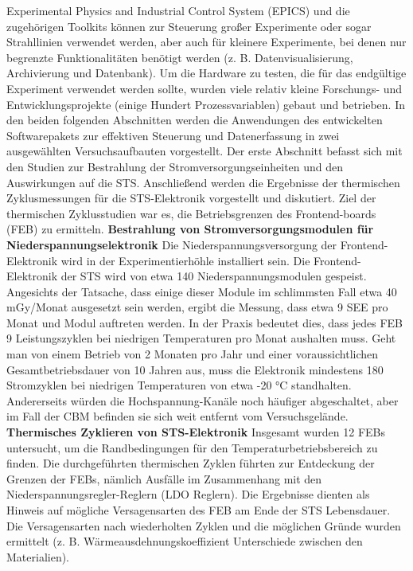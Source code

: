 Experimental Physics and Industrial Control System (EPICS) und die zugehörigen Toolkits können zur Steuerung großer Experimente oder sogar Strahllinien verwendet werden, aber auch für kleinere Experimente, bei denen nur begrenzte Funktionalitäten benötigt werden (z. B. Datenvisualisierung, Archivierung und Datenbank). Um die Hardware zu testen, die für das endgültige Experiment verwendet werden sollte, wurden viele relativ kleine Forschungs- und Entwicklungsprojekte (einige Hundert Prozessvariablen) gebaut und betrieben. In den beiden folgenden Abschnitten werden die Anwendungen des entwickelten Softwarepakets zur effektiven Steuerung und Datenerfassung in zwei ausgewählten Versuchsaufbauten vorgestellt. Der erste Abschnitt befasst sich mit den Studien zur Bestrahlung der Stromversorgungseinheiten und den Auswirkungen auf die \gls{STS}. Anschließend werden die Ergebnisse der thermischen Zyklusmessungen für die \gls{STS}-Elektronik vorgestellt und diskutiert. Ziel der thermischen Zyklusstudien war es, die Betriebsgrenzen des Frontend-boards (FEB) zu ermitteln.
\bigbreak
\textbf{Bestrahlung von Stromversorgungsmodulen für Niederspannungselektronik}
\bigbreak
Die Niederspannungsversorgung der Frontend-Elektronik wird in der Experimentierhöhle installiert sein. Die Frontend-Elektronik der \gls{STS} wird von etwa 140 Niederspannungsmodulen gespeist. Angesichts der Tatsache, dass einige dieser Module im schlimmsten Fall etwa 40\,mGy/Monat ausgesetzt sein werden, ergibt die Messung, dass etwa 9 SEE pro Monat und Modul auftreten werden. In der Praxis bedeutet dies, dass jedes FEB 9 Leistungszyklen bei niedrigen Temperaturen pro Monat aushalten muss. Geht man von einem Betrieb von 2 Monaten pro Jahr und einer voraussichtlichen Gesamtbetriebsdauer von 10 Jahren aus, muss die Elektronik mindestens 180 Stromzyklen bei niedrigen Temperaturen von etwa -20 °C standhalten. Andererseits würden die Hochspannung-Kanäle noch häufiger abgeschaltet, aber im Fall der \gls{CBM} befinden sie sich weit entfernt vom Versuchsgelände.
\bigbreak
\textbf{Thermisches Zyklieren von \gls{STS}-Elektronik}
\bigbreak
Insgesamt wurden 12 FEBs untersucht, um die Randbedingungen für den Temperaturbetriebsbereich zu finden. Die durchgeführten thermischen Zyklen führten zur Entdeckung der Grenzen der FEBs, nämlich Ausfälle im Zusammenhang mit den Niederspannungsregler-Reglern (LDO Reglern). Die Ergebnisse dienten als Hinweis auf mögliche Versagensarten des \gls{FEB} am Ende der \gls{STS} Lebensdauer. Die Versagensarten nach wiederholten Zyklen und die möglichen Gründe wurden ermittelt (z. B. Wärmeausdehnungskoeffizient Unterschiede zwischen den Materialien). 


